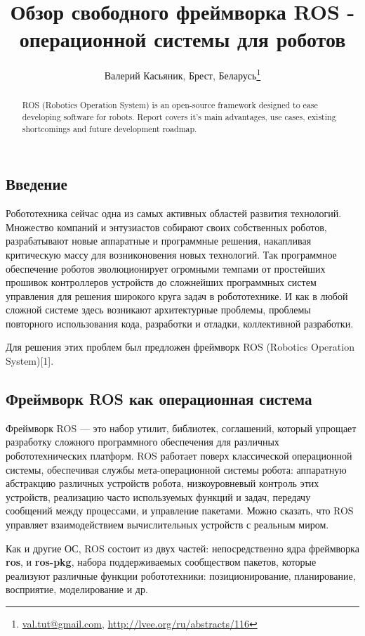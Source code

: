 \documentclass[10pt, a5paper]{article}
\begin{document}
\title{Обзор свободного фреймворка ROS - операционной системы для роботов}
\author{Валерий Касьяник, Брест, Беларусь\footnote{\url{val.tut@gmail.com}, \url{http://lvee.org/ru/abstracts/116}}}
\maketitle
\begin{abstract}
ROS (Robotics Operation System) is an open-source framework designed to ease developing software for robots. Report covers it's main  advantages, use cases, existing shortcomings and future development roadmap.
\end{abstract}
\subsection*{Введение}

Робототехника сейчас одна из самых активных областей развития технологий. Множество компаний и  энтузиастов собирают своих собственных роботов, разрабатывают новые аппаратные и программные решения, накапливая критическую массу для возниконовения новых технологий. Так программное обеспечение роботов эволюционирует огромными темпами от простейших прошивок контроллеров устройств до сложнейших программных систем управления для решения широкого круга задач в робототехнике. И как в любой сложной системе здесь возникают архитектурные проблемы, проблемы повторного использования кода, разработки и отладки, коллективной разработки.

Для решения этих проблем был предложен фреймворк ROS  (Robotics Operation System)[1].

\subsection*{Фреймворк ROS как операционная система}

Фреймворк ROS — это набор утилит, библиотек, соглашений, который упрощает разработку сложного программного обеспечения для различных робототехнических платформ. ROS работает поверх классической операционной системы, обеспечивая службы мета-операционной системы робота: аппаратную абстракцию различных устройств робота, низкоуровневый контроль этих устройств, реализацию часто используемых функций и задач, передачу сообщений между процессами, и управление пакетами. Можно сказать, что ROS управляет взаимодействием вычислительных устройств с реальным миром.

Как и другие ОС, ROS состоит из двух частей: непосредственно ядра фреймворка \textbf{ros}, и \textbf{ros-pkg}, набора поддерживаемых сообществом пакетов, которые реализуют различные функции робототехники: позиционирование, планирование, восприятие, моделирование и др.
\end{document}
